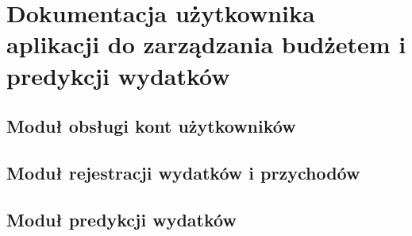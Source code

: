 \chapter{Dokumentacja użytkownika aplikacji do zarządzania budżetem i predykcji wydatków}
\section{Moduł obsługi kont użytkowników}
\section{Moduł rejestracji wydatków i przychodów}
\section{Moduł predykcji wydatków}